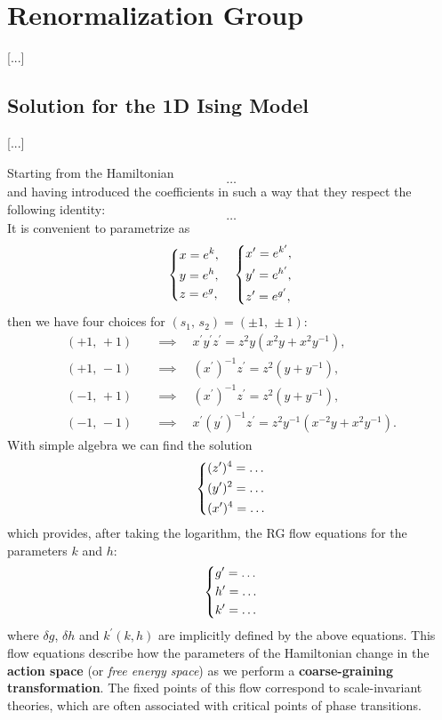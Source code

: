 \chapter{Renormalization Group}

 [...]

\section{Solution for the 1D Ising Model}

 [...]

Starting from the Hamiltonian
\[
    \dots
\]
and having introduced the coefficients in such a way that they respect the following identity:
\[
    \dots
\]
It is convenient to parametrize as
\[
    \begin{dcases}
        x = e^k, \\
        y = e^h, \\
        z = e^g,
    \end{dcases} \quad \begin{dcases}
        x^{\prime} = e^{k^{\prime}}, \\
        y^{\prime} = e^{h^{\prime}}, \\
        z^{\prime} = e^{g^{\prime}},
    \end{dcases}
\]
then we have four choices for \((s_1,\,s_2) = (\pm 1,\, \pm 1)\):
\[
    \begin{aligned}
        (+1,\,+1) \quad & \implies \quad x^{\prime} y^{\prime} z^{\prime} = z^2 y (x^2 y + x^2 y^{-1}),                \\
        (+1,\,-1) \quad & \implies \quad (x^{\prime})^{-1} z^{\prime} = z^2 (y + y^{-1}),                              \\
        (-1,\,+1) \quad & \implies \quad (x^{\prime})^{-1} z^{\prime} = z^2 (y + y^{-1}),                              \\
        (-1,\,-1) \quad & \implies \quad x^{\prime} (y^{\prime})^{-1} z^{\prime} = z^2 y^{-1} (x^{-2} y + x^2 y^{-1}).
    \end{aligned}
\]
With simple algebra we can find the solution
\[
    \begin{dcases}
        (z^{\prime})^4 = \dots \\
        (y^{\prime})^2 = \dots \\
        (x^{\prime})^4 = \dots
    \end{dcases}
\]
which provides, after taking the logarithm, the RG flow equations for the parameters \(k\) and \(h\):
\[
    \begin{dcases}
        g^{\prime} = \dots \\
        h^{\prime} = \dots \\
        k^{\prime} = \dots
    \end{dcases}
\]
where \(\delta g\), \(\delta h\) and \(k^{\prime} (k, h)\) are implicitly defined by the above equations. This flow equations describe how the parameters of the Hamiltonian change in the \textbf{action space} (or \textit{free energy space}) as we perform a \textbf{coarse-graining transformation}. The fixed points of this flow correspond to scale-invariant theories, which are often associated with critical points of phase transitions.

